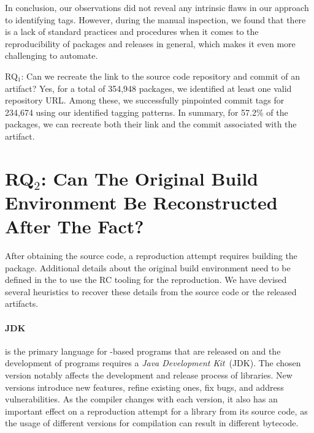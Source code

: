 \documentclass[smallextended]{svjour3}
\newcommand{\RQ}[1]{RQ$_{#1}$}
\newcommand{\maven}[1]{\tool{Maven{#1}}}
\newcommand{\java}{\tool{Java}}
\begin{document}
In conclusion, our observations did not reveal any intrinsic flaws in our approach to identifying tags. However, during the manual inspection, we found that there is a lack of standard practices and procedures when it comes to the reproducibility of packages and releases in general, which makes it even more challenging to automate.

\begin{tcolorbox}
\RQ{1}: Can we recreate the link to the source code repository and commit of an artifact? Yes, for a total of 354,948 packages, we identified at least one valid repository URL. Among these, we successfully pinpointed commit tags for 234,674 using our identified tagging patterns. In summary, for 57.2\% of the packages, we can recreate both their link and the commit associated with the artifact.
\end{tcolorbox}



\section{\RQ{2}: Can The Original Build Environment Be Reconstructed After The Fact?}
\label{sec:rq2}

After obtaining the source code, a reproduction attempt requires building the package. Additional details about the original build environment need to be defined in the  to use the RC tooling for the reproduction. We have devised several heuristics to recover these details from the source code or the released artifacts.

\paragraph{JDK}
\label{sec:method:jdk}
\java{} is the primary language for -based programs that are released on \maven{} and the development of \java{} programs requires a \emph{Java Development Kit}~(JDK). The chosen \java{} version notably affects the development and release process of libraries. New \java{} versions introduce new features, refine existing ones, fix bugs, and address vulnerabilities. As the compiler changes with each version, it also has an important effect on a reproduction attempt for a library from its source code, as the usage of different \java{} versions for compilation can result in different bytecode.
\end{document}
